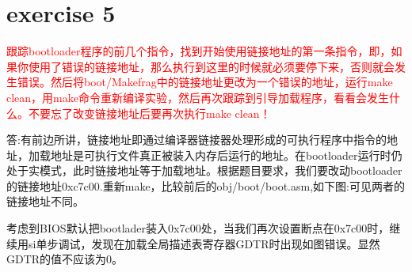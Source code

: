 \documentclass[]{ctexrep}
\begin{document}
\section{exercise 5}
\textcolor{red}{跟踪bootloader程序的前几个指令，找到开始使用链接地址的第一条指令，即，如果你使用了错误的链接地址，那么执行到这里的时候就必须要停下来，否则就会发生错误。然后将boot/Makefrag中的链接地址更改为一个错误的地址，运行make clean，用make命令重新编译实验，然后再次跟踪到引导加载程序，看看会发生什么。不要忘了改变链接地址后要再次执行make clean！}\par
答:有前边所讲，链接地址即通过编译器链接器处理形成的可执行程序中指令的地址，加载地址是可执行文件真正被装入内存后运行的地址。在bootloader运行时仍处于实模式，此时链接地址等于加载地址。根据题目要求，我们要改动bootloader的链接地址0xc7c00.重新make，比较前后的obj/boot/boot.asm,如下图:可见两者的链接地址不同。\par
\begin{figure}[htbp]
	\centering
\end{figure}
考虑到BIOS默认把bootlader装入0x7c00处，当我们再次设置断点在0x7c00时，继续用si单步调试，发现在加载全局描述表寄存器GDTR时出现如图错误。显然GDTR的值不应该为0。
\end{document}
